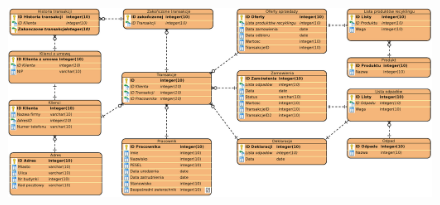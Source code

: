 
\begin{landscape}
	\begin{figure}
		\centering
		\centerline{\includegraphics[width=28cm]{img/ERD.eps}}
	\end{figure}
\end{landscape}


